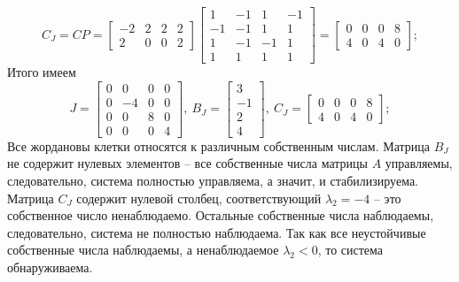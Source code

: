 \documentclass[a4paper, 12pt]{article}
\begin{document}
    $$
    C_J=CP=\begin{bmatrix}
        -2 &2 &2 &2\\
        2 &0 &0 &2
    \end{bmatrix}\begin{bmatrix}
        1    &-1     &1    &-1\\
        -1    &-1     &1     &1\\
         1    &-1    &-1     &1\\
         1     &1     &1     &1
        \end{bmatrix}=\begin{bmatrix}
    0     &0     &0     &8\\
     4     &0     &4     &0
        \end{bmatrix};
    $$
    Итого имеем
    $$
    J=\begin{bmatrix}
        0     &0     &0     &0\\
        0    &-4     &0     &0\\
        0     &0     &8     &0\\
        0     &0     &0     &4
        \end{bmatrix},\ B_J=\begin{bmatrix}
            3\\
            -1\\
             2\\
             4
        \end{bmatrix},\ C_J=\begin{bmatrix}
            0     &0     &0     &8\\
             4     &0     &4     &0
                \end{bmatrix};
    $$
    Все жордановы клетки относятся к различным собственным числам.
    Матрица $B_J$ не содержит нулевых элементов -- все собственные числа
    матрицы $A$ управляемы, следовательно, система полностью управляема, а значит, и стабилизируема.
    Матрица $C_J$ содержит нулевой столбец, соответствующий $\lambda_2=-4$
    -- это собственное число ненаблюдаемо. Остальные собственные числа наблюдаемы,
    следовательно, система не полностью наблюдаема. Так как все неустойчивые
    собственные числа наблюдаемы, а ненаблюдаемое $\lambda_2<0$, то система обнаруживаема.
\end{document}
